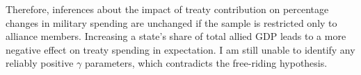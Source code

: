 \documentclass[12pt]{article}
\begin{document}
Therefore, inferences about the impact of treaty contribution on percentage changes in military spending are unchanged if the sample is restricted only to alliance members. 
Increasing a state's share of total allied GDP leads to a more negative effect on treaty spending in expectation. 
I am still unable to identify any reliably positive $\gamma$ parameters, which contradicts the free-riding hypothesis. 








\singlespace


 
\end{document}
